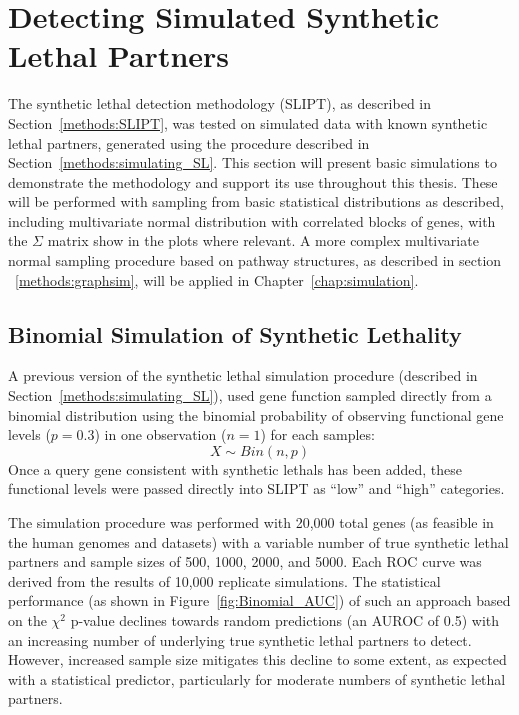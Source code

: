 \FloatBarrier

\section{Detecting Simulated Synthetic Lethal Partners} \label{chapt2:simulation_2015}

The \gls{synthetic lethal} detection methodology (\gls{SLIPT}), as described in Section~\ref{methods:SLIPT}, was tested on simulated data with known \gls{synthetic lethal} partners, generated using the procedure described in Section~\ref{methods:simulating_SL}. This section will present basic simulations to demonstrate the methodology and support its use throughout this thesis. These will be performed with sampling from basic statistical distributions as described, including multivariate normal distribution with correlated blocks of genes, with the $\Sigma$ matrix show in the plots where relevant. A more complex multivariate normal sampling procedure based on pathway  structures, as described in section ~\ref{methods:graphsim}, will be applied in Chapter~\ref{chap:simulation}. 

\subsection{Binomial Simulation of Synthetic Lethality} \label{chapt2:simulation_binom}


A previous version of the \gls{synthetic lethal} simulation procedure (described in Section~\ref{methods:simulating_SL}), used gene function sampled directly from a binomial distribution using the binomial probability of observing functional gene levels ($p = 0.3$) in one observation ($n = 1$) for each samples: $$X\sim Bin(n,p)$$  Once a query gene consistent with \glspl{synthetic lethal} has been added, these functional levels were passed directly into \gls{SLIPT} as ``low'' and ``high'' categories.

The simulation procedure was performed with 20,000 total genes (as feasible in the human \glspl{genome} and  datasets) with a variable number of true \gls{synthetic lethal} partners and sample sizes of 500, 1000, 2000, and 5000. Each \gls{ROC} curve was derived from the results of 10,000 replicate simulations. The statistical performance (as shown in Figure~\ref{fig:Binomial_AUC}) of such an approach based on the $\chi^2$ p-value declines towards random predictions (an \gls{AUROC} of 0.5) with an increasing number of underlying true \gls{synthetic lethal} partners to detect. However, increased sample size mitigates this decline to some extent, as expected with a statistical predictor, particularly for moderate numbers of \gls{synthetic lethal} partners. 

